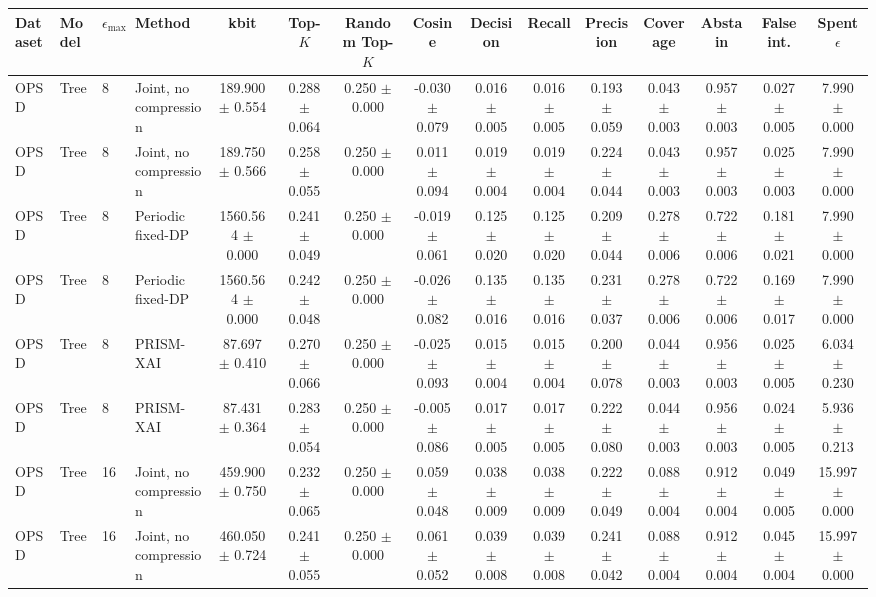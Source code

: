\begin{tabular}{llllccccccccccc}
\toprule
Dataset & Model & $\epsilon_{\max}$ & Method & kbit & Top-$K$ & Random Top-$K$ & Cosine & Decision & Recall & Precision & Coverage & Abstain & False int. & Spent $\epsilon$ \\
\midrule
OPSD & Tree & 8 & Joint, no compression & 189.900 $\pm$ 0.554 & 0.288 $\pm$ 0.064 & 0.250 $\pm$ 0.000 & -0.030 $\pm$ 0.079 & 0.016 $\pm$ 0.005 & 0.016 $\pm$ 0.005 & 0.193 $\pm$ 0.059 & 0.043 $\pm$ 0.003 & 0.957 $\pm$ 0.003 & 0.027 $\pm$ 0.005 & 7.990 $\pm$ 0.000 \\
OPSD & Tree & 8 & Joint, no compression & 189.750 $\pm$ 0.566 & 0.258 $\pm$ 0.055 & 0.250 $\pm$ 0.000 & 0.011 $\pm$ 0.094 & 0.019 $\pm$ 0.004 & 0.019 $\pm$ 0.004 & 0.224 $\pm$ 0.044 & 0.043 $\pm$ 0.003 & 0.957 $\pm$ 0.003 & 0.025 $\pm$ 0.003 & 7.990 $\pm$ 0.000 \\
OPSD & Tree & 8 & Periodic fixed-DP & 1560.564 $\pm$ 0.000 & 0.241 $\pm$ 0.049 & 0.250 $\pm$ 0.000 & -0.019 $\pm$ 0.061 & 0.125 $\pm$ 0.020 & 0.125 $\pm$ 0.020 & 0.209 $\pm$ 0.044 & 0.278 $\pm$ 0.006 & 0.722 $\pm$ 0.006 & 0.181 $\pm$ 0.021 & 7.990 $\pm$ 0.000 \\
OPSD & Tree & 8 & Periodic fixed-DP & 1560.564 $\pm$ 0.000 & 0.242 $\pm$ 0.048 & 0.250 $\pm$ 0.000 & -0.026 $\pm$ 0.082 & 0.135 $\pm$ 0.016 & 0.135 $\pm$ 0.016 & 0.231 $\pm$ 0.037 & 0.278 $\pm$ 0.006 & 0.722 $\pm$ 0.006 & 0.169 $\pm$ 0.017 & 7.990 $\pm$ 0.000 \\
OPSD & Tree & 8 & PRISM-XAI & 87.697 $\pm$ 0.410 & 0.270 $\pm$ 0.066 & 0.250 $\pm$ 0.000 & -0.025 $\pm$ 0.093 & 0.015 $\pm$ 0.004 & 0.015 $\pm$ 0.004 & 0.200 $\pm$ 0.078 & 0.044 $\pm$ 0.003 & 0.956 $\pm$ 0.003 & 0.025 $\pm$ 0.005 & 6.034 $\pm$ 0.230 \\
OPSD & Tree & 8 & PRISM-XAI & 87.431 $\pm$ 0.364 & 0.283 $\pm$ 0.054 & 0.250 $\pm$ 0.000 & -0.005 $\pm$ 0.086 & 0.017 $\pm$ 0.005 & 0.017 $\pm$ 0.005 & 0.222 $\pm$ 0.080 & 0.044 $\pm$ 0.003 & 0.956 $\pm$ 0.003 & 0.024 $\pm$ 0.005 & 5.936 $\pm$ 0.213 \\
OPSD & Tree & 16 & Joint, no compression & 459.900 $\pm$ 0.750 & 0.232 $\pm$ 0.065 & 0.250 $\pm$ 0.000 & 0.059 $\pm$ 0.048 & 0.038 $\pm$ 0.009 & 0.038 $\pm$ 0.009 & 0.222 $\pm$ 0.049 & 0.088 $\pm$ 0.004 & 0.912 $\pm$ 0.004 & 0.049 $\pm$ 0.005 & 15.997 $\pm$ 0.000 \\
OPSD & Tree & 16 & Joint, no compression & 460.050 $\pm$ 0.724 & 0.241 $\pm$ 0.055 & 0.250 $\pm$ 0.000 & 0.061 $\pm$ 0.052 & 0.039 $\pm$ 0.008 & 0.039 $\pm$ 0.008 & 0.241 $\pm$ 0.042 & 0.088 $\pm$ 0.004 & 0.912 $\pm$ 0.004 & 0.045 $\pm$ 0.004 & 15.997 $\pm$ 0.000 \\

\end{tabular}
